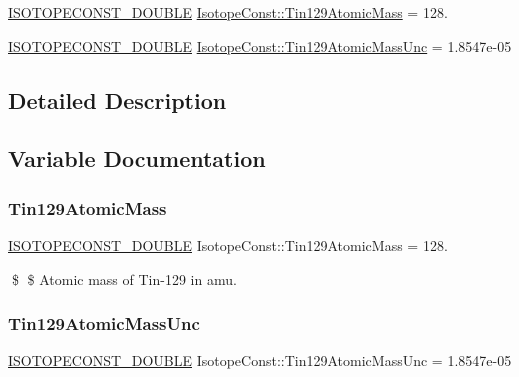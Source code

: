 \begin{DoxyCompactItemize}
\item 
\mbox{\hyperlink{group___isotope_const-_macros_ga8f45a7272ce02c0b4c65c44636ed719a}{I\+S\+O\+T\+O\+P\+E\+C\+O\+N\+S\+T\+\_\+\+D\+O\+U\+B\+LE}} \mbox{\hyperlink{group___isotope_const-_tin-_sn129_ga405374fab5d6ac6e91b60ed777cd5460}{Isotope\+Const\+::\+Tin129\+Atomic\+Mass}} = 128.
\item 
\mbox{\hyperlink{group___isotope_const-_macros_ga8f45a7272ce02c0b4c65c44636ed719a}{I\+S\+O\+T\+O\+P\+E\+C\+O\+N\+S\+T\+\_\+\+D\+O\+U\+B\+LE}} \mbox{\hyperlink{group___isotope_const-_tin-_sn129_ga2dc87192cf48c29f74c40fcf38fb711e}{Isotope\+Const\+::\+Tin129\+Atomic\+Mass\+Unc}} = 1.\+8547e-\/05
\end{DoxyCompactItemize}


\subsection{Detailed Description}


\subsection{Variable Documentation}
\mbox{\label{group___isotope_const-_tin-_sn129_ga405374fab5d6ac6e91b60ed777cd5460}} 
\subsubsection{\texorpdfstring{Tin129\+Atomic\+Mass}{Tin129AtomicMass}}
{\footnotesize\ttfamily \mbox{\hyperlink{group___isotope_const-_macros_ga8f45a7272ce02c0b4c65c44636ed719a}{I\+S\+O\+T\+O\+P\+E\+C\+O\+N\+S\+T\+\_\+\+D\+O\+U\+B\+LE}} Isotope\+Const\+::\+Tin129\+Atomic\+Mass = 128.}

\$ \$ Atomic mass of Tin-\/129 in amu. \mbox{\label{group___isotope_const-_tin-_sn129_ga2dc87192cf48c29f74c40fcf38fb711e}} 
\subsubsection{\texorpdfstring{Tin129\+Atomic\+Mass\+Unc}{Tin129AtomicMassUnc}}
{\footnotesize\ttfamily \mbox{\hyperlink{group___isotope_const-_macros_ga8f45a7272ce02c0b4c65c44636ed719a}{I\+S\+O\+T\+O\+P\+E\+C\+O\+N\+S\+T\+\_\+\+D\+O\+U\+B\+LE}} Isotope\+Const\+::\+Tin129\+Atomic\+Mass\+Unc = 1.\+8547e-\/05}

